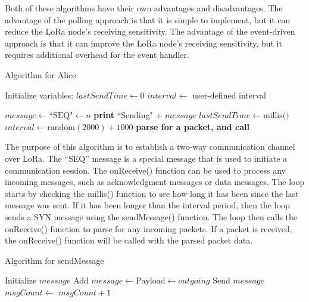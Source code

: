 Both of these algorithms have their own advantages and disadvantages. The advantage of the polling approach is that it is simple to implement, but it can reduce the LoRa node's receiving sensitivity. The advantage of the event-driven approach is that it can improve the LoRa node's receiving sensitivity, but it requires additional overhead for the event handler.
\begin{algorithm}[hbt!]
  \caption{Algorithm for Alice}\label{alg:Alice}
  \begin{algorithmic}
  \State Initialize variables:
      \State $lastSendTime \gets 0$
      \State $interval \gets$ user-defined interval
      
              \State $message \gets \text{``SEQ"} \gets n$
              \State {}
              \State \textbf{print} ``Sending" $+$ $message$
              \State $lastSendTime \gets \text{millis()}$
              \State $interval \gets \text{random}(2000) + 1000$ 
          \EndIf
          \State \textbf{parse for a packet, and call} 
      \EndFunction
  \end{algorithmic}
\end{algorithm}
The purpose of this algorithm is to establish a two-way communication channel over LoRa. The “SEQ” message is a special message that is used to initiate a communication session. The onReceive() function can be used to process any incoming messages, such as acknowledgment messages or data messages.
The loop starts by checking the millis() function to see how long it has been since the last message was sent. If it has been longer than the interval period, then the loop sends a SYN message using the sendMessage() function.
The loop then calls the onReceive() function to parse for any incoming packets. If a packet is received, the onReceive() function will be called with the parsed packet data.
\begin{algorithm}[hbt!]
  \caption{Algorithm for sendMessage}\label{alg:sendMessage}
  \begin{algorithmic}
          \State Initialize $message$
          \State Add $message \gets \text{Payload} \gets outgoing$
          \State Send $message$
          \State $msgCount \gets$ $msgCount + 1$
      \EndFunction
  \end{algorithmic}
  \end{algorithm}
